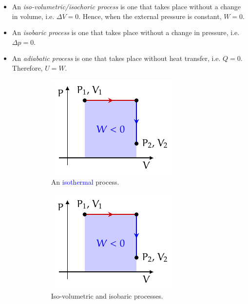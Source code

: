 \documentclass[oneside]{book}
\begin{document}
\begin{itemize}
    \item An \emph{\textcolor{pink!75!red}{iso-volumetric/isochoric} process} is one that takes place without a change in volume, i.e. \(\Delta V=0\). Hence, when the external pressure is constant, \(W=0\).  
    \item An \emph{\textcolor{green!85!black}{isobaric} process} is one that takes place without a change in pressure, i.e. \(\Delta p=0\).
    \item An \emph{\textcolor{red!60!black}{adiabatic} process} is one that takes place without heat transfer, i.e. \(Q=0\). Therefore, \(U=W\).
    \begin{figure}[H]
        \centering
        \begin{subfigure}[c]{0.30\textwidth}
            \centering
            \includegraphics[page=6]{../images/Thermodynamics/Thermodynamics.pdf}
            \caption{An \textcolor{blue}{isothermal} process.}
            \label{fig:isothermal}
        \end{subfigure}%
        \begin{subfigure}[c]{0.30\textwidth}
            \centering
            \includegraphics[page=7]{../images/Thermodynamics/Thermodynamics.pdf}
            \caption{\textcolor{pink!75!red}{Iso-volumetric} and \textcolor{green!85!black}{isobaric} processes.}
            \label{fig:iso-volumetric}
        \end{subfigure}%
        \begin{subfigure}[c]{0.30\textwidth}
            \centering

\end{subfigure}
\end{figure}
\end{itemize}
\end{document}

